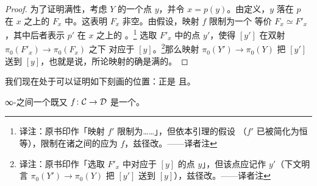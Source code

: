 \begin{proof}
为了证明满性，考虑 $Y$ 的一个点 $y$，并令 $x = p(y)$。由定义，$y$ 落在 $p$ 在
$x$ 之上的\trFibre{} $F_x$ 中。这表明 $F_x$ 非空。由假设，映射 $f$ 限制为一个%
\trHomotopy{}等价 $F_x \simeq F'_x$，其中后者表示 $p'$ 在 $x$ 之上的%
\trFibre{}。\footnote{译注：原书印作「映射 $f'$ 限制为……」，但依本引理的假设
（$f'$ 已被简化为恒等），限制在诸\trFibre{}之间的应为 $f$，兹径改。——译者注}
选取 $F'_x$ 中的点 $y'$，使得 $[y']$ 在双射 $\pi_0(F'_x) \to \pi_0(F_x)$ 之下
对应于 $[y]$。\footnote{译注：原书印作「选取 $F'_x$ 中对应于 $[y]$ 的点
$y$」，但该点应记作 $y'$（下文明言 $\pi_0(Y') \to \pi_0(Y)$ 把 $[y']$ 送到
$[y]$），兹径改。——译者注}那么映射 $\pi_0(Y') \to \pi_0(Y)$ 把 $[y']$ 送到
$[y]$，也就是说，所论映射的确是满的。
\end{proof}

我们现在处于可以证明如下刻画的位置：\trJoyalEquivalence{}正是%
\trEssentiallySurjective{}且\trFullyFaithful{}\trFunctor{}。

\begin{theorem}\label{thm:ffes-joyal-equivalence}
∞-\trCategories{}之间一个既\trFullyFaithful{}又\trEssentiallySurjective{}%
\trFunctor{} $f\colon \mathcal{C} \to \mathcal{D}$ 是一个\trJoyalEquivalence{}。
\end{theorem}

